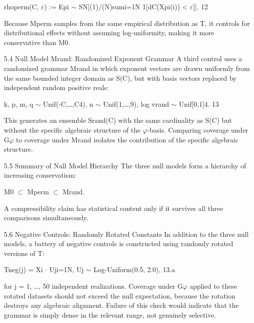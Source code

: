   rhoperm(C, $\varepsilon$) := Epi $\sim$ SN[(1)/(N)sumi=1N 1[dC(Xpi(i)) < $\varepsilon$]]. 12

  Because Mperm samples from the same empirical distribution as T, it controls for
  distributional effects without assuming log-uniformity, making it more conservative
  than M0.

  5.4 Null Model Mrand: Randomized Exponent Grammar
  A third control uses a randomized grammar Mrand in which exponent vectors are
  drawn uniformly from the same bounded integer domain as S(C), but with basis vectors
  replaced by independent random positive reals:

  k, p, m, q $\sim$ Unif({-C,…,C}4), n $\sim$ Unif({1,…,9}), log vrand $\sim$ Unif[0,1]4. 13

  This generates an ensemble Srand(C) with the same cardinality as S(C) but without the
  specific algebraic structure of the $\varphi$-basis. Comparing coverage under G$\varphi$ to coverage
  under Mrand isolates the contribution of the specific algebraic structure.

  5.5 Summary of Null Model Hierarchy
  The three null models form a hierarchy of increasing conservatism:

  M0 $\subset$ Mperm $\subset$ Mrand.

  A compressibility claim has statistical content only if it survives all three comparisons
  simultaneously.

  5.6 Negative Controls: Randomly Rotated Constants
  In addition to the three null models, a battery of negative controls is constructed using
  randomly rotated versions of T:

  Tneg(j) = {Xi $\cdot$ Uj}i=1N, Uj $\sim$ Log-Uniform(0.5, 2.0), 13.a

  for j = 1, …, 50 independent realizations. Coverage under G$\varphi$ applied to these rotated
  datasets should not exceed the null expectation, because the rotation destroys any
  algebraic alignment. Failure of this check would indicate that the grammar is simply
  dense in the relevant range, not genuinely selective.

